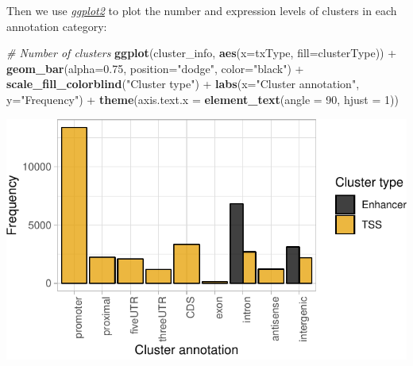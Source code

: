 \documentclass[9pt,a4paper,]{extarticle}
\newenvironment{Shaded}{\begin{snugshade}}{\end{snugshade}}
\newcommand{\KeywordTok}[1]{\textcolor[rgb]{0.13,0.29,0.53}{\textbf{{#1}}}}
\newcommand{\DataTypeTok}[1]{\textcolor[rgb]{0.13,0.29,0.53}{{#1}}}
\newcommand{\DecValTok}[1]{\textcolor[rgb]{0.00,0.00,0.81}{{#1}}}
\newcommand{\FloatTok}[1]{\textcolor[rgb]{0.00,0.00,0.81}{{#1}}}
\newcommand{\StringTok}[1]{\textcolor[rgb]{0.31,0.60,0.02}{{#1}}}
\newcommand{\CommentTok}[1]{\textcolor[rgb]{0.56,0.35,0.01}{\textit{{#1}}}}
\newcommand{\NormalTok}[1]{{#1}}
\begin{document}
Then we use \emph{\href{https://CRAN.R-project.org/package=ggplot2}{ggplot2}} to plot the number and expression levels of clusters in each annotation category:

\begin{Shaded}
\begin{Highlighting}[]
\CommentTok{# Number of clusters}
\KeywordTok{ggplot}\NormalTok{(cluster_info, }\KeywordTok{aes}\NormalTok{(}\DataTypeTok{x=}\NormalTok{txType, }\DataTypeTok{fill=}\NormalTok{clusterType)) +}
\StringTok{    }\KeywordTok{geom_bar}\NormalTok{(}\DataTypeTok{alpha=}\FloatTok{0.75}\NormalTok{, }\DataTypeTok{position=}\StringTok{"dodge"}\NormalTok{, }\DataTypeTok{color=}\StringTok{"black"}\NormalTok{) +}
\StringTok{    }\KeywordTok{scale_fill_colorblind}\NormalTok{(}\StringTok{"Cluster type"}\NormalTok{) +}
\StringTok{    }\KeywordTok{labs}\NormalTok{(}\DataTypeTok{x=}\StringTok{"Cluster annotation"}\NormalTok{, }\DataTypeTok{y=}\StringTok{"Frequency"}\NormalTok{) +}
\StringTok{    }\KeywordTok{theme}\NormalTok{(}\DataTypeTok{axis.text.x =} \KeywordTok{element_text}\NormalTok{(}\DataTypeTok{angle =} \DecValTok{90}\NormalTok{, }\DataTypeTok{hjust =} \DecValTok{1}\NormalTok{))}
\end{Highlighting}
\end{Shaded}

\begin{center}\includegraphics{CAGEWorkflow_files/figure-latex/plotTxTypes-1} \end{center}
\end{document}

